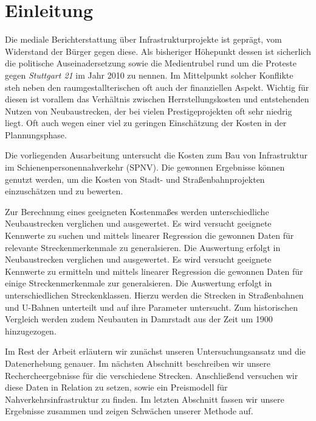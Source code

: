 \section{Einleitung}


Die mediale Berichterstattung über Infrastrukturprojekte ist geprägt, vom Widerstand der
Bürger gegen diese. Als bisheriger Höhepunkt dessen ist sicherlich die politische
Auseinadersetzung sowie die Medientrubel rund um die Proteste gegen \emph{Stuttgart 21} im
Jahr 2010 zu nennen. Im Mittelpunkt solcher Konflikte steh neben den raumgestallterischen
oft auch der finanziellen Aspekt. Wichtig für diesen ist vorallem das Verhältnis zwischen
Herrstellungskosten und entstehenden Nutzen von Neubaustrecken, der bei vielen
Prestigeprojekten oft sehr niedrig liegt. Oft auch wegen einer viel zu geringen
Einschätzung der Kosten in der Plannungsphase.

Die vorliegenden Ausarbeitung untersucht die Kosten zum Bau von Infrastruktur im
Schienenpersonennahverkehr (SPNV). Die gewonnen Ergebnisse können genutzt werden, um die
Kosten von Stadt- und Straßenbahnprojekten einzuschätzen und zu bewerten.

Zur Berechnung eines geeigneten Kostenmaßes werden unterschiedliche
Neubaustrecken verglichen und ausgewertet. Es wird versucht geeignete
Kennwerte zu suchen und mittels linearer Regression die gewonnen Daten
für relevante Streckenmerkenmale zu generalsieren. Die Auswertung erfolgt in
Neubaustrecken verglichen und ausgewertet. Es wird versucht geeignete Kennwerte
zu ermitteln und  mittels linearer Regression die gewonnen Daten für einige
Streckenmerkenmale zur generalsieren. Die Auswertung erfolgt in
unterschiedlichen Streckenklassen. Hierzu werden die Strecken in Straßenbahnen
und U-Bahnen unterteilt und auf ihre Parameter untersucht. Zum historischen
Vergleich werden zudem Neubauten in Damrstadt aus der Zeit um 1900 hinzugezogen.

Im Rest der Arbeit erläutern wir zunächst unseren Untersuchungsansatz und die
Datenerhebung genauer. Im nächsten Abschnitt beschreiben wir unsere Rechercheergebnisse
für die verschiedene Strecken. Anschließend versuchen wir diese Daten in Relation zu
setzen, sowie ein Preismodell für Nahverkehrsinfrastruktur zu finden. Im letzten Abschnitt
fassen wir unsere Ergebnisse zusammen und zeigen Schwächen unserer Methode auf.

